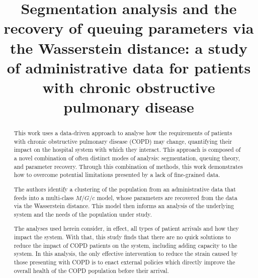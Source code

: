 \documentclass[]{interact}
\theoremstyle{plain}%
\theoremstyle{definition}
\theoremstyle{remark}
\begin{document}

\title{%
  Segmentation analysis and the recovery of queuing parameters via the
  Wasserstein distance: a study of administrative data for patients with chronic
  obstructive pulmonary disease
}

\author{%
}

\maketitle

\begin{abstract}
    This work uses a data-driven approach to analyse how the requirements of
    patients with chronic obstructive pulmonary disease (COPD) may change,
    quantifying their impact on the hospital system with which they interact.
    This approach is composed of a novel combination of often distinct modes of
    analysis: segmentation, queuing theory, and parameter recovery. Through this
    combination of methods, this work demonstrates how to overcome potential
    limitations presented by a lack of fine-grained data.

    The authors identify a clustering of the population from an administrative
    data that feeds into a multi-class \(M/G/c\) model, whose parameters are
    recovered from the data via the Wasserstein distance. This model then
    informs an analysis of the underlying system and the needs of the population
    under study.
    
    The analyses used herein consider, in effect, all types of patient arrivals
    and how they impact the system. With that, this study finds that there are
    no quick solutions to reduce the impact of COPD patients on the system,
    including adding capacity to the system. In this analysis, the only
    effective intervention to reduce the strain caused by those presenting with
    COPD is to enact external policies which directly improve the overall health
    of the COPD population before their arrival.
\end{abstract}
\end{document}
